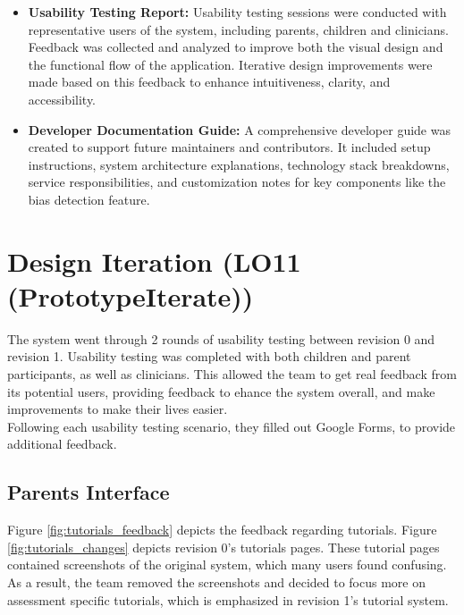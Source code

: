 \documentclass{article}
\begin{document}
\begin{itemize}
    \item \textbf{Usability Testing Report:} Usability testing sessions were conducted with representative users of the system, including parents, children and clinicians. 
    Feedback was collected and analyzed to improve both the visual design and the functional flow of the application. Iterative design improvements were made based on this feedback to enhance intuitiveness, clarity, and accessibility.
    
    \item \textbf{Developer Documentation Guide:} A comprehensive developer guide was created to support future maintainers and contributors. 
    It included setup instructions, system architecture explanations, technology stack breakdowns, service responsibilities, and customization notes for key components like the bias detection feature.
\end{itemize}

\newpage

\section{Design Iteration (LO11 (PrototypeIterate))}

\hspace{2em} The system went through 2 rounds of usability testing between revision 0 and revision 1. Usability testing was completed with both children and parent participants, as well as clinicians.
This allowed the team to get real feedback from its potential users, providing feedback to ehance the system overall, and make improvements to make their lives easier.\\
Following each usability testing scenario, they filled out Google Forms, to provide additional feedback.

\subsection{Parents Interface}

\hspace{2em} Figure \ref{fig:tutorials_feedback} depicts the feedback regarding tutorials. Figure \ref{fig:tutorials_changes} depicts revision 0's tutorials pages.
These tutorial pages contained screenshots of the original system, which many users found confusing. As a result, the team removed the screenshots and decided to focus more on
assessment specific tutorials, which is emphasized in revision 1's tutorial system.
\end{document}
